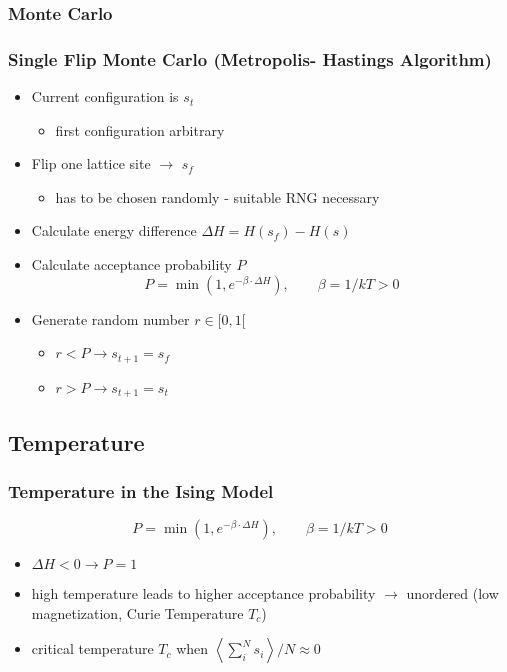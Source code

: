 \documentclass{beamer}
\begin{document}
\subsubsection{Monte Carlo}
\begin{frame}\frametitle{Single Flip Monte Carlo (Metropolis- Hastings Algorithm)}
\begin{itemize}
\item Current configuration is $s_t$
\begin{itemize}
\item first configuration arbitrary
\end{itemize}
\item Flip one lattice site $\rightarrow$ $s_f$
\begin{itemize}
\item  has to be chosen randomly - suitable RNG necessary
\end{itemize}
\item Calculate energy difference $\Delta H = H(s_f) - H(s)$
\item Calculate acceptance probability $P$
\begin{equation*}
P = \operatorname{min}\left(1,e^{-\beta\cdot \Delta H}\right),\qquad \beta = 1/kT > 0 
\end{equation*}
\item Generate random number $r \in [0,1[$
\begin{itemize}
\item $r<P \rightarrow s_{t+1} = s_f$ 
\item $r>P \rightarrow s_{t+1} = s_t$ 
\end{itemize}
\end{itemize}
\end{frame}

\subsection{Temperature}
\begin{frame}\frametitle{Temperature in the Ising Model}
\begin{equation*}
P = \operatorname{min}\left(1,e^{-\beta\cdot \Delta H}\right),\qquad \beta = 1/kT > 0
\end{equation*}
\begin{itemize}
\item $\Delta H < 0 \rightarrow P = 1$
\item high temperature leads to higher acceptance probability
$\rightarrow$ unordered (low magnetization, Curie Temperature $T_c$)
\item critical temperature $T_c$ when $\left<\sum_i^N s_i\right>/N \approx 0$
\end{itemize}
\end{frame}
\end{document}
